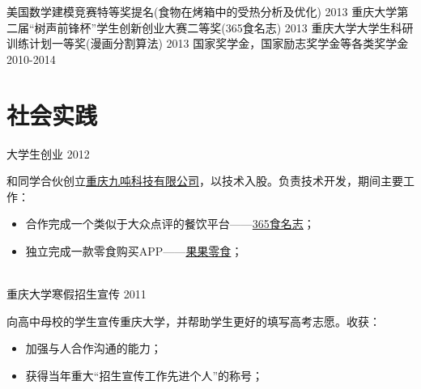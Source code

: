 \documentclass[]{friggeri-cv_cn} %
\begin{document}
\begin{entrylist}
\entryac
{美国数学建模竞赛特等奖提名(食物在烤箱中的受热分析及优化)}
{2013}
\entryac
{重庆大学第二届“树声前锋杯”学生创新创业大赛二等奖(365食名志)}
{2013}
\entryac
{重庆大学大学生科研训练计划一等奖(漫画分割算法)}
{2013}
\entryac
{国家奖学金，国家励志奖学金等各类奖学金}
{2010-2014}

\end{entrylist}


\section{社会实践}
\begin{entrylist}
\entry
{大学生创业}
{2012}
{和同学合伙创立\href{http://nineton.cn/}{重庆九吨科技有限公司}，以技术入股。负责技术开发，期间主要工作：
\begin{itemize}
\item 合作完成一个类似于大众点评的餐饮平台------\href{http://nineton.cn/product.php?id=17}{365食名志}；
\item 独立完成一款零食购买APP------\href{http://apk.gfan.com/Product/App584080.html}{果果零食}；
\end{itemize}
}
\\
\entry
{重庆大学寒假招生宣传}
{2011}
{向高中母校的学生宣传重庆大学，并帮助学生更好的填写高考志愿。收获：
\begin{itemize}
    \item 加强与人合作沟通的能力；
    \item 获得当年重大“招生宣传工作先进个人”的称号；
\end{itemize}
}
\end{entrylist}
\end{document}
